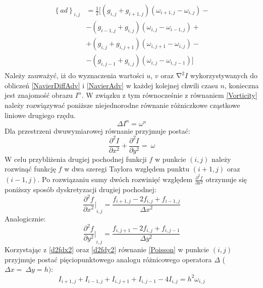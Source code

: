 \documentclass[12pt, twoside, openany]{report}
\theoremstyle{definition}
\begin{document}
\begin{align}
\begin{aligned}
{\left\{ad\right\}}_{i,j}
&= \frac{1}{2}\biggl[\left(g_{i,j}+g_{i+1,j}\right)\left({\omega }_{i+1,j}-{\omega }_{i,j}\right) -\\[1ex]
&- \left(g_{i-1,j}+g_{i,j}\right)\left({\omega }_{i,j}-{\omega }_{i-1,j}\right) +  \\[1ex]
&+ \left(g_{i,j}+g_{i,j+1}\right)\left({\omega }_{i,j+1}-{\omega }_{i,j}\right) -\\[1ex]
&- \left(g_{i,j-1}+g_{i,j}\right)\left({\omega }_{i,j}-{\omega }_{i,j-1}\right)\biggl]
\end{aligned}
\label{discreteAnisotropic2}
\end{align}
Należy zauważyć, iż do wyznaczenia wartości $u$, $v$ oraz ${\mathrm{\nabla }}^2I$ wykorzystywanych do obliczeń \eqref{NavierDiffAdv} i \eqref{NavierAdv} w każdej kolejnej chwili czasu $n$, konieczna jest znajomość obrazu $I^n$. W związku z tym równocześnie z równaniem \eqref{Vorticity} należy rozwiązywać poniższe niejednorodne równanie różniczkowe cząstkowe liniowe drugiego rzędu.
\begin{equation}
\Delta I^n={\omega }^n
\label{Poisson}
\end{equation}
Dla przestrzeni dwuwymiarowej równanie przyjmuje postać:
\begin{equation}
\frac{{\partial }^2I}{\partial x^2}+\frac{{\partial }^2I}{\partial y^2}=\ \omega
\label{Poisson2D}
\end{equation}
W celu przybliżenia drugiej pochodnej funkcji $f$ w punkcie $(i,j)$ należy rozwinąć funkcję $f$ w dwa szeregi Taylora względem punktu $(i+1,j)$ oraz $(i-1,j)$. Po rozwiązaniu sumy dwóch rozwinięć względem $\frac{{\partial }^2f}{\partial x^2}$ otrzymuje się poniższy sposób dyskretyzacji drugiej pochodnej:
\begin{equation}
{\frac{{\partial }^2f}{\partial x^2}\bigg|}_{i,j}\mathrm{=}\frac{f_{i+1,j}-2f_{i,j}+f_{i-1,j}}{\Delta x^2}
\label{d2fdx2}
\end{equation}
Analogicznie:
\begin{equation}
{\frac{{\partial }^2f}{\partial y^2}\bigg|}_{i,j}\mathrm{=}\frac{f_{i,j+1}-2f_{i,j}+f_{i,j-1}}{\Delta y^2}
\label{d2fdy2}
\end{equation}
Korzystając z \eqref{d2fdx2} oraz \eqref{d2fdy2} równanie \eqref{Poisson} w punkcie $(i,j)$ przyjmuje postać pięciopunktowego analogu różnicowego operatora $\Delta $ ($\Delta x=\ \Delta y=h)$:
\begin{equation}
I_{i+1,j}+I_{i-1,j}+I_{i,j+1}+I_{i,j-1}-4I_{i,j}=h^2{\omega }_{i,j}
\label{Laplace}
\end{equation}
\end{document}
